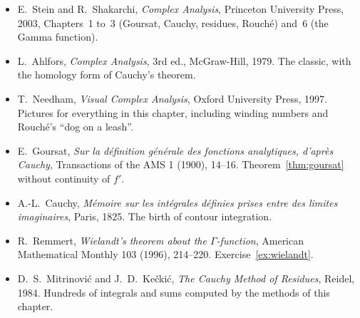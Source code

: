 \begin{itemize}
\item E.~Stein and R.~Shakarchi, \emph{Complex Analysis}, Princeton University Press, 2003, Chapters~1 to~3 (Goursat,
Cauchy, residues, Rouch\'e) and~6 (the Gamma function).
\item L.~Ahlfors, \emph{Complex Analysis}, 3rd ed., McGraw-Hill, 1979. The classic, with the homology form of Cauchy's theorem.
\item T.~Needham, \emph{Visual Complex Analysis}, Oxford University Press, 1997. Pictures for everything in this chapter,
including winding numbers and Rouch\'e's ``dog on a leash''.
\item E.~Goursat, \emph{Sur la d\'efinition g\'en\'erale des fonctions analytiques, d'apr\`es Cauchy}, Transactions of the AMS 1
(1900), 14--16. Theorem~\ref{thm:goursat} without continuity of $f'$.
\item A.-L.~Cauchy, \emph{M\'emoire sur les int\'egrales d\'efinies prises entre des limites imaginaires}, Paris, 1825. The birth
of contour integration.
\item R.~Remmert, \emph{Wielandt's theorem about the $\Gamma$-function}, American Mathematical Monthly 103 (1996), 214--220.
Exercise~\ref{ex:wielandt}.
\item D.~S.~Mitrinovi\'c and J.~D.~Ke\v cki\'c, \emph{The Cauchy Method of Residues}, Reidel, 1984. Hundreds of integrals and
sums computed by the methods of this chapter.
\end{itemize}
